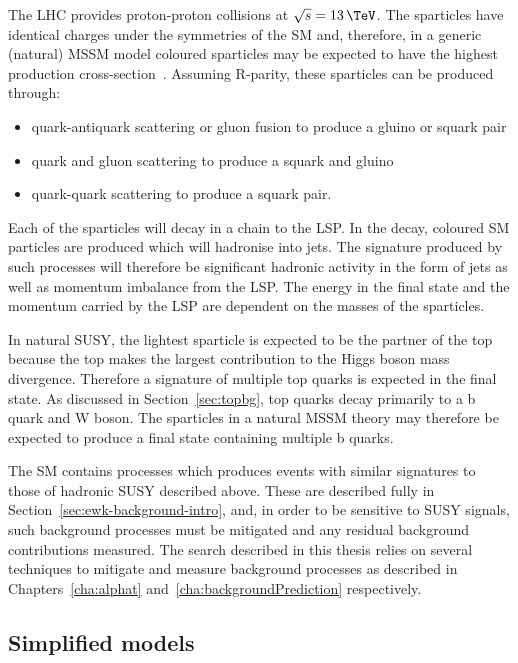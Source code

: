 The LHC provides proton-proton collisions at $\sqrt{s} = 13\,\TeV$. The sparticles have identical charges under 
the symmetries of the SM and, therefore, in a generic (natural) MSSM model 
coloured sparticles may be expected to have the highest production 
cross-section~\cite{susyprod}. Assuming R-parity, these sparticles can be produced through:

\begin{itemize}
\item quark-antiquark scattering or gluon fusion to produce a gluino or squark pair
\item quark and gluon scattering to produce a squark and gluino
\item quark-quark scattering to produce a squark pair.
\end{itemize}

Each of the sparticles will decay in a chain to the LSP. In the decay, 
coloured SM particles are produced which will hadronise into jets.
The signature produced by such processes will therefore be significant hadronic activity in 
the form of jets as well as momentum imbalance from the LSP. The energy in
the final state and the momentum carried by the LSP are dependent on the masses
of the sparticles.

In natural SUSY, the lightest sparticle is expected to be the partner of the top
because the top makes the largest contribution to the Higgs boson mass divergence. Therefore a signature
of multiple top quarks is expected in the final state. As discussed in Section~\ref{sec:topbg}, top quarks
decay primarily to a b quark and W boson. The sparticles in a natural MSSM theory may therefore be expected
to produce a final state containing multiple b quarks.

The SM contains processes which produces events with similar signatures to 
those of hadronic SUSY described above. These are described fully in Section~\ref{sec:ewk-background-intro},
and, in order to be sensitive to SUSY signals, such background processes must be mitigated 
and any residual background contributions measured. The search described in this thesis relies on several
techniques to mitigate and measure background processes as described in Chapters~\ref{cha:alphat} and~\ref{cha:backgroundPrediction}
respectively.

\subsection{Simplified models}


